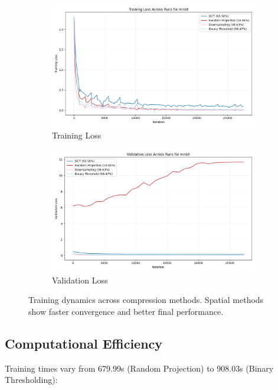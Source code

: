\documentclass{article} %
\begin{document}
\begin{figure}[h]
    \centering
    \begin{subfigure}{0.49\textwidth}
        \includegraphics[width=\textwidth]{train_loss_mnist_across_runs.png}
        \caption{Training Loss}
        \label{fig:train-loss}
    \end{subfigure}
    \hfill
    \begin{subfigure}{0.49\textwidth}
        \includegraphics[width=\textwidth]{val_loss_mnist_across_runs.png}
        \caption{Validation Loss}
        \label{fig:val-loss}
    \end{subfigure}
    \caption{Training dynamics across compression methods. Spatial methods show faster convergence and better final performance.}
    \label{fig:training}
\end{figure}

\subsection{Computational Efficiency}
Training times vary from 679.99s (Random Projection) to 908.03s (Binary Thresholding):
\end{document}

